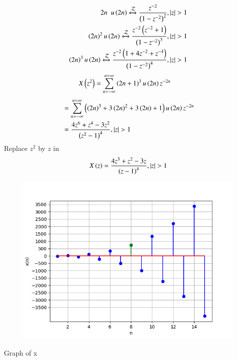 \documentclass[beamer]{IEEEtran}
\theoremstyle{remark}
\begin{document}
\begin{align}
	{2n} \hspace{5pt} u\left(2n\right) \xleftrightarrow{\mathcal{Z}} \frac{z^{-2}}{\left(1-z^{-2}\right)^2},\left\vert z\right\vert >1 \\
    \left(2n\right)^2  u\left(2n\right) \xleftrightarrow{\mathcal{Z}} \frac{z^{-2}\left(z^{-2}+1\right)}{\left(1-z^{-2}\right)^3},\left\vert z\right\vert > 1 \\
	\left(2n\right)^3 u\left(2n\right) \xleftrightarrow{\mathcal{Z}}  \frac{z^{-2}\left(1+4z^{-2}+z^{-4}\right)}{\left(1-z^{-2}\right)^4},\left\vert z\right\vert >1
\end{align}
\begin{align}
	X\left(z^2\right) &=\sum_{n=-\infty}^{n=\infty}\left(2n+1\right)^{3}u\left(2n\right)z^{-2n}
\end{align}
\begin{align}
	&=\sum_{n=-\infty}^{n=\infty}\left(\left(2n\right)^3+3\left(2n\right)^2+3\left(2n\right)+1\right)u\left(2n\right)z^{-2n} \\
&=\frac{4z^6+z^4-3z^2}{\left(z^2-1\right)^4}, \left\vert z\right\vert>1 
\end{align}
Replace $z^2$ by $z$ in 
\begin{align}
	X\left(z\right)=\frac{4z^3+z^2-3z}{\left(z-1\right)^4} , \left\vert z\right\vert>1
\end{align}

\begin{figure}[h]
    \centering
    \includegraphics[width=1 \columnwidth]{figs/graph.png} 
    \label{fig:11.9.1.9.1}
\end{figure}
\begin{center}
Graph of x
   \end{center}
\end{document}
